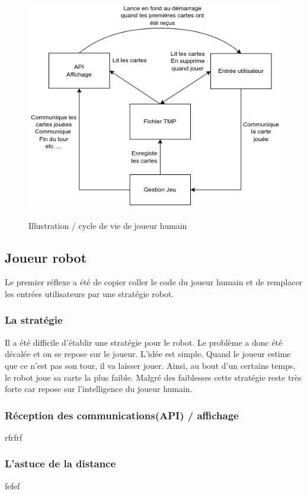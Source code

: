 \documentclass{article}
\begin{document}
\begin{figure}[!htb]
	\centering
    	\includegraphics[height=10cm]{./assets/JoueurHumain.png}
    	\caption{Illustration / cycle de vie de joueur humain}
\end{figure}

\newpage

\subsection{Joueur robot}
Le premier réflexe a été de copier coller le code du joueur humain et de remplacer les entrées utilisateurs par une stratégie robot. 

\subsubsection{La stratégie}
Il a été difficile d'établir une stratégie pour le robot. Le problème a donc été décalée et on se repose sur le joueur. L'idée est simple. Quand le joueur estime que ce n'est pas son tour, il va laisser jouer. Ainsi, au bout d'un certains temps, le robot joue sa carte la plus faible. Malgré des faiblesses cette stratégie reste très forte car repose sur l'intelligence du joueur humain. 

\subsubsection{Réception des communications(API) / affichage}
rfrfrf

\subsubsection{L'astuce de la distance}
fefef
\end{document}
